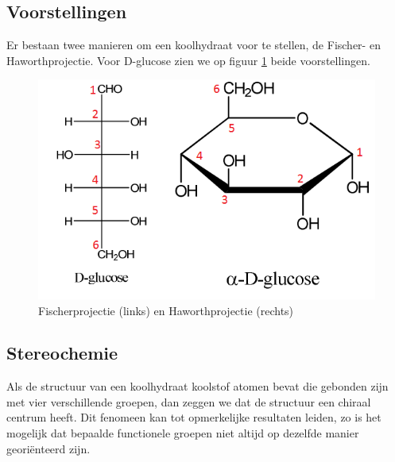 \documentclass[a4paper,kul]{kulakarticle} %
\begin{document}
\subsection{Voorstellingen}
Er bestaan twee manieren om een koolhydraat voor te stellen, de Fischer- en Haworthprojectie. Voor D-glucose zien we op figuur \ref{fig:fishervshaworth} beide voorstellingen.
\begin{figure}[h]
	\centering
	\includegraphics[width=0.6\linewidth]{FisherVSHaworth}
	\caption[Fischer- en Haworthprojectie]{Fischerprojectie (links) en Haworthprojectie (rechts)}
	\label{fig:fishervshaworth}
\end{figure}

\subsection{Stereochemie}
Als de structuur van een koolhydraat koolstof atomen bevat die gebonden zijn met vier verschillende groepen, dan zeggen we dat de structuur een chiraal centrum heeft. Dit fenomeen kan tot opmerkelijke resultaten leiden, zo is het mogelijk dat bepaalde functionele groepen niet altijd op dezelfde manier georiënteerd zijn.  
\end{document}
